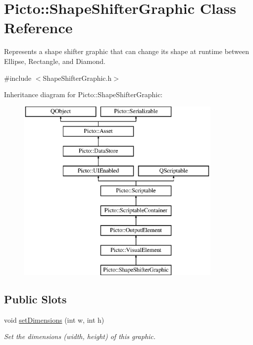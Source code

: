\hypertarget{class_picto_1_1_shape_shifter_graphic}{\section{Picto\-:\-:Shape\-Shifter\-Graphic Class Reference}
\label{class_picto_1_1_shape_shifter_graphic}
}


Represents a shape shifter graphic that can change its shape at runtime between Ellipse, Rectangle, and Diamond.  




{\ttfamily \#include $<$Shape\-Shifter\-Graphic.\-h$>$}

Inheritance diagram for Picto\-:\-:Shape\-Shifter\-Graphic\-:\begin{figure}[H]
\begin{center}
\leavevmode
\includegraphics[height=9.000000cm]{class_picto_1_1_shape_shifter_graphic}
\end{center}
\end{figure}
\subsection*{Public Slots}
\begin{DoxyCompactItemize}
\item 
\hypertarget{class_picto_1_1_shape_shifter_graphic_a362cb2fb5e1422737c1fc26e89792986}{void \hyperlink{class_picto_1_1_shape_shifter_graphic_a362cb2fb5e1422737c1fc26e89792986}{set\-Dimensions} (int w, int h)}\label{class_picto_1_1_shape_shifter_graphic_a362cb2fb5e1422737c1fc26e89792986}

\begin{DoxyCompactList}\small\item\em Set the dimensions (width, height) of this graphic. \end{DoxyCompactList}\end{DoxyCompactItemize}
